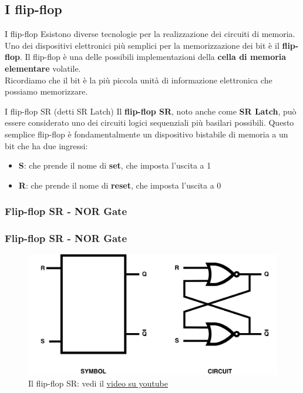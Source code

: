 \subsection[I flip-flop]{I flip-flop}
\begin{frame}
	
	\begin{block}{I flip-flop}
		Esistono diverse tecnologie per la realizzazione dei circuiti di memoria. Uno dei dispositivi elettronici più semplici per la memorizzazione dei bit è il \textbf{flip-flop}. Il flip-flop è una delle possibili implementazioni della \textbf{cella di memoria elementare} volatile. \\ Ricordiamo che il bit è la più piccola unità di informazione elettronica che possiamo memorizzare.
	\end{block}
	
	\begin{block}{I flip-flop SR (detti SR Latch)}
		Il \textbf{flip-flop SR}, noto anche come \textbf{SR Latch}, può essere considerato uno dei circuiti logici sequenziali più basilari possibili. Questo semplice flip-flop è fondamentalmente un dispositivo bistabile di memoria a un bit che ha due ingressi:
		\begin{itemize}
			\item \textbf{S}: che prende il nome di \textbf{set}, che imposta l'uscita a 1
			\item \textbf{R}: che prende il nome di \textbf{reset}, che imposta l'uscita a 0
		\end{itemize}
	\end{block}
	
\end{frame}


\subsubsection[Flip-flop SR - NOR Gate]{Flip-flop SR - NOR Gate}
\begin{frame}
	\frametitle{Flip-flop SR - NOR Gate}
	 
	\begin{figure}[!htbp] 
		\centering
		\includegraphics[width=0.95\linewidth]{images/5_memory/flip_flop_sr_nor.pdf}
		\caption{Il flip-flop SR: vedi il \underline{\href{https://www.youtube.com/watch?v=br2pbjAnP2k}{video su youtube}}}
	\end{figure}
	
\end{frame}

